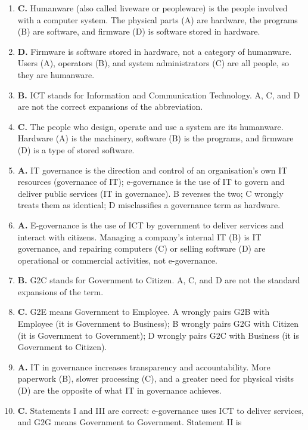\begin{enumerate}[label=\textbf{Q\arabic*.}, leftmargin=*]
\item \textbf{C.} Humanware (also called liveware or peopleware) is the people
  involved with a computer system. The physical parts (A) are hardware, the
  programs (B) are software, and firmware (D) is software stored in hardware.
\item \textbf{D.} Firmware is software stored in hardware, not a category of
  humanware. Users (A), operators (B), and system administrators (C) are all
  people, so they are humanware.
\item \textbf{B.} ICT stands for Information and Communication Technology. A,
  C, and D are not the correct expansions of the abbreviation.
\item \textbf{C.} The people who design, operate and use a system are its
  humanware. Hardware (A) is the machinery, software (B) is the programs, and
  firmware (D) is a type of stored software.
\item \textbf{A.} IT governance is the direction and control of an
  organisation's own IT resources (governance of IT); e-governance is the use
  of IT to govern and deliver public services (IT in governance). B reverses
  the two; C wrongly treats them as identical; D misclassifies a governance
  term as hardware.
\item \textbf{A.} E-governance is the use of ICT by government to deliver
  services and interact with citizens. Managing a company's internal IT (B) is
  IT governance, and repairing computers (C) or selling software (D) are
  operational or commercial activities, not e-governance.
\item \textbf{B.} G2C stands for Government to Citizen. A, C, and D are not
  the standard expansions of the term.
\item \textbf{C.} G2E means Government to Employee. A wrongly pairs G2B with
  Employee (it is Government to Business); B wrongly pairs G2G with Citizen
  (it is Government to Government); D wrongly pairs G2C with Business (it is
  Government to Citizen).
\item \textbf{A.} IT in governance increases transparency and accountability.
  More paperwork (B), slower processing (C), and a greater need for physical
  visits (D) are the opposite of what IT in governance achieves.
\item \textbf{C.} Statements I and III are correct: e-governance uses ICT to
  deliver services, and G2G means Government to Government. Statement II is

\end{enumerate}

